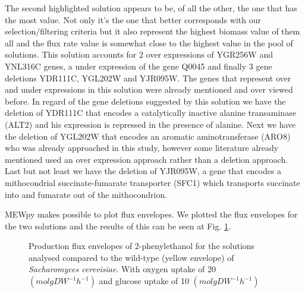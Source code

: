 \documentclass[runningheads]{llncs}
\begin{document}
The second highlighted solution appears to be, of all the other, the one that has the most value. Not only it's the one that better corresponds with our selection/filtering criteria but it also represent the highest biomass value of them all and the flux rate value is somewhat close to the highest value in the pool of solutions. This solution accounts for 2 over expressions of YGR256W and YNL316C genes, a under expression of the gene Q0045 and finally 3 gene deletions YDR111C, YGL202W and YJR095W. The genes that represent over and under expressions in this solution were already mentioned and over viewed before. In regard of the gene deletions suggested by this solution we have the deletion of YDR111C that encodes a catalytically inactive alanine transaminase (ALT2) and his expression is repressed in the presence of alanine. Next we have the deletion of YGL202W that encodes an aromatic aminotransferase (ARO8) who was already approached in this study, however some literature already mentioned used an over expression approach rather than a deletion approach. Last but not least we have the deletion of YJR095W, a gene that encodes a mithocondrial succinate-fumarate transporter (SFC1) which transports succinate into and fumarate out of the mithocondrion.

MEWpy makes possible to plot flux envelopes. We plotted the flux envelopes for the two solutions and the results of this can be seen at Fig. \ref{fig:flux_envelopes}.

\begin{figure}[]
  \centering
  \hfill
  \caption{Production flux envelopes of 2-phenylethanol for the solutions analysed compared to the wild-type (yellow envelope) of \emph{Sacharomyces cerevisiae}. With oxygen uptake of 20 $(mol gDW^{-1} h^{-1})$ and glucose uptake of 10 $(mol gDW^{-1} h^{-1})$}
  \label{fig:flux_envelopes}
\end{figure}
\end{document}
